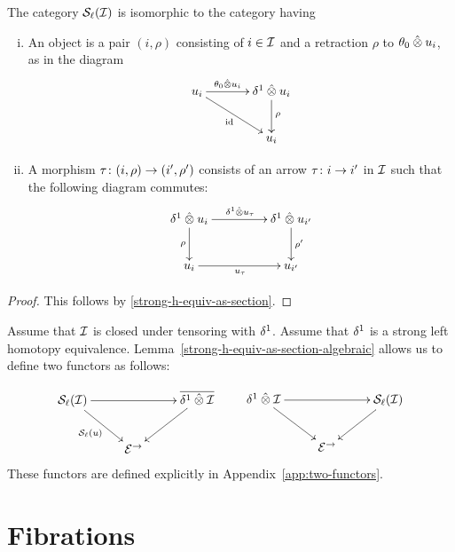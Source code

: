 \documentclass[reqno,10pt,a4paper,oneside]{amsart}
\begin{document}
\begin{lemma}
\label{strong-h-equiv-as-section-algebraic}
The category $\cal{S}_\ell(\cal{I})$ is  isomorphic to the category having
\begin{enumerate}[(i)]
\item An object is a pair $(i, \rho)$ consisting of $i \in \cal{I}$ and a retraction $\rho$ to $\thetal \hatotimes u_i$, as in the diagram
\[
\xymatrix@C+1em{
u_i 
  \ar[r]^-{\thetal \hatotimes u_i }
  \ar[dr]_{\id}
&
  \rcyl \hatotimes u_i \ar[d]^{\rho}
\\&
  u_i
}
\]
\item A morphism $\tau \co (i, \rho) \to (i', \rho')$ consists of an arrow $\tau \co i \to i'$ in $\cal{I}$ such that the following
diagram commutes:
\[
\xymatrix@C+2em{
  \rcyl \hatotimes u_i 
  \ar[d]_-{\rho}
  \ar[r]^{\rcyl \hatotimes u_\tau }
&
 \rcyl \hatotimes u_{i'} 
  \ar[d]^-{\rho'}
\\
  u_i
  \ar[r]_{u_\tau}
&
  u_{i'}
}
\]
\end{enumerate}
\end{lemma}

\begin{proof} This follows by \cref{strong-h-equiv-as-section}.
\end{proof}



Assume that $\cal{I}$ is closed under tensoring with $\rcyl$.
Assume that $\rcyl$ is a strong left homotopy equivalence.
Lemma~\ref{strong-h-equiv-as-section-algebraic} allows us to define two functors as follows:

\begin{equation}
\label{she-to-retract-closure} 
\xycenter{
\cal{S}_\ell(\cal{I})  \ar[dr]_{\cal{S}_\ell(u)} \ar[rr] & & \overline{\rcyl \hatotimes \cal{I}} \ar[dl] \\
  & \catE^{\to} & } \qquad
\xycenter{
\rcyl \hatotimes \cal{I} \ar[dr] \ar[rr] & & \cal{S}_\ell(\cal{I}) \ar[dl] \\ 
 & \catE^\to & } \medskip
\end{equation}
These functors are defined explicitly in Appendix~\ref{app:two-functors}.

\section{Fibrations} 
\label{sec:frobenius-uniform-fibration}
 
\end{document}
